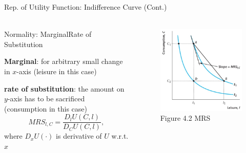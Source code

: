\documentclass[11pt,aspectratio=169,usenames,dvipsnames]{beamer}
\let\tempone\itemize
\let\temptwo\enditemize
\renewenvironment{itemize}{\tempone\addtolength{\itemsep}{\fill}}{\temptwo}
\begin{document}
\begin{frame}{Rep. of Utility Function: Indifference Curve (Cont.)}
\label{slide:Rep_of_Utility_Function__Indifference_Curve__Cont__}
\framesubtitle{}
    \begin{columns}
        \begin{column}{0.5\textwidth}
            \begin{itemize}
                \item \alert{Normality}: M{\tiny arginal}R{\tiny ate of }S{\tiny ubstitution}
                \begin{itemize}
                    \item \textbf{Marginal}: for \alert{arbitrary small} change in $ x $-axis (leisure in this case)
                    \item \textbf{rate of substitution}: the amount on $ y $-axis has to be sacrificed (consumption in this case)
                \end{itemize}
                \begin{equation}
                \label{eq:MRS}
                    MRS_{l, C} = \frac{D_{l} U( C, l )}{D_{C}U( C, l )}
                ,\end{equation}
                where $ D_{x}U( \cdot ) $ is derivative of $ U $ w.r.t. $ x $
            \end{itemize}
        \end{column}
        \begin{column}{0.5\textwidth}
        \begin{figure}
            \caption{Figure 4.2 MRS}
            \includegraphics[width=.8\textwidth]{./figures/Figure4_2.jpg}
        \end{figure}
        \end{column}
    \end{columns}
\end{frame}
\end{document}
